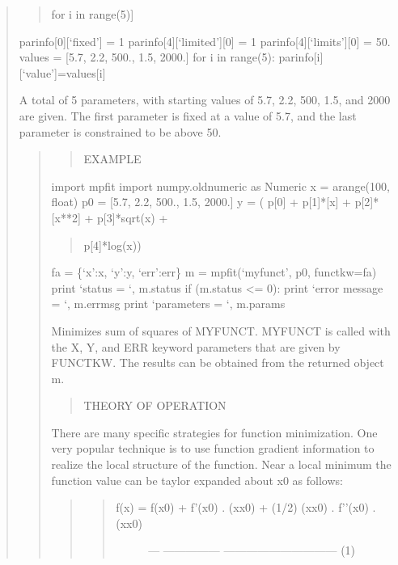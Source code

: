 \documentclass[letterpaper,10pt,english]{sphinxmanual}
\begin{document}
\begin{quote}
\begin{quote}
for i in range(5){]}
\end{quote}

parinfo{[}0{]}{[}‘fixed’{]} = 1
parinfo{[}4{]}{[}‘limited’{]}{[}0{]} = 1
parinfo{[}4{]}{[}‘limits’{]}{[}0{]}  = 50.
values = {[}5.7, 2.2, 500., 1.5, 2000.{]}
for i in range(5): parinfo{[}i{]}{[}‘value’{]}=values{[}i{]}

A total of 5 parameters, with starting values of 5.7,
2.2, 500, 1.5, and 2000 are given.  The first parameter
is fixed at a value of 5.7, and the last parameter is
constrained to be above 50.
\begin{quote}
\begin{quote}

EXAMPLE
\end{quote}

import mpfit
import numpy.oldnumeric as Numeric
x = arange(100, float)
p0 = {[}5.7, 2.2, 500., 1.5, 2000.{]}
y = ( p{[}0{]} + p{[}1{]}*{[}x{]} + p{[}2{]}*{[}x**2{]} + p{[}3{]}*sqrt(x) +
\begin{quote}

p{[}4{]}*log(x))
\end{quote}

fa = \{‘x’:x, ‘y’:y, ‘err’:err\}
m = mpfit(‘myfunct’, p0, functkw=fa)
print ‘status = ‘, m.status
if (m.status \textless{}= 0): print ‘error message = ‘, m.errmsg
print ‘parameters = ‘, m.params

Minimizes sum of squares of MYFUNCT.  MYFUNCT is called with the X,
Y, and ERR keyword parameters that are given by FUNCTKW.  The
results can be obtained from the returned object m.
\begin{quote}

THEORY OF OPERATION
\end{quote}

There are many specific strategies for function minimization.  One
very popular technique is to use function gradient information to
realize the local structure of the function.  Near a local minimum
the function value can be taylor expanded about x0 as follows:
\begin{quote}
\begin{quote}
\begin{description}
\item[{f(x) = f(x0) + f’(x0) . (x\sphinxhyphen{}x0) + (1/2) (x\sphinxhyphen{}x0) . f’’(x0) . (x\sphinxhyphen{}x0)}] \leavevmode
—\textendash{}   —————   ——————————\sphinxhyphen{}  (1)

\end{description}
\end{quote}


\end{quote}
\end{quote}
\end{quote}
\end{document}
